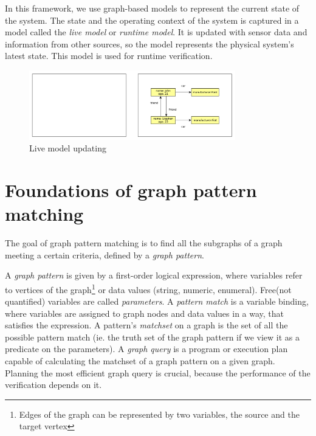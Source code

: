 In this framework, we use graph-based models to represent the current state of the system. 
The state and the operating context of the system is captured in a model called the \emph{live model} or \emph{runtime model}.
It is updated with sensor data and information from other sources, so the model represents the physical system's latest state. 
This model is used for runtime verification.


\begin{figure}[h]
	\begin{center}
		\includegraphics[width=0.8\textwidth]{figures/live-models.pdf}
		\caption{Live model updating}
		\label{fig:live-models}
	\end{center}
\end{figure}

\section{Foundations of graph pattern matching}
\label{section:gpmc}


The goal of graph pattern matching is to find all the subgraphs of a graph meeting a certain criteria, defined by a \emph{graph pattern}.

A \emph{graph pattern} is given by a first-order logical expression, where variables refer to vertices of the graph\footnote{Edges of the graph can be represented by two variables, the source and the target vertex} or data values (string, numeric, enumeral).
Free(not quantified) variables are called \emph{parameters}.  
A \emph{pattern match} is a variable binding, where variables are assigned to graph nodes and data values in a way, that satisfies the expression.
A pattern's \emph{matchset} on a graph is the set of all the possible pattern match (ie. the truth set of the graph pattern if we view it as a predicate on the parameters).
A \emph{graph query} is a program or execution plan capable of calculating the matchset of a graph pattern on a given graph. 
Planning the most efficient graph query is crucial, because the performance of the verification depends on it.

